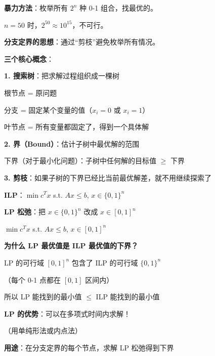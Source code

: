\documentclass[12pt, a4paper]{ctexart}
\begin{document}
\begin{blackboard}[分支定界的核心思想]

\textbf{暴力方法}：枚举所有 $2^n$ 种 0-1 组合，找最优的。

$n = 50$ 时，$2^{50} \approx 10^{15}$，不可行。

\textbf{分支定界的思想}：通过``剪枝''避免枚举所有情况。

\textbf{三个核心概念}：

\textbf{1. 搜索树}：把求解过程组织成一棵树

根节点 = 原问题

分支 = 固定某个变量的值（$x_i = 0$ 或 $x_i = 1$）

叶节点 = 所有变量都固定了，得到一个具体解

\textbf{2. 界（Bound）}：估计子树中最优解的范围

下界（对于最小化问题）：子树中任何解的目标值 $\geq$ 下界

\textbf{3. 剪枝}：如果子树的下界已经比当前最优解差，就不用继续探索了

\end{blackboard}

\begin{blackboard}[LP 松弛：计算下界的方法]

\textbf{ILP}：$\min c^T x$ \quad s.t. \quad $Ax \leq b$, \quad $x \in \{0, 1\}^n$

\textbf{LP 松弛}：把 $x \in \{0, 1\}^n$ 改成 $x \in [0, 1]^n$

$\min c^T x$ \quad s.t. \quad $Ax \leq b$, \quad $x \in [0, 1]^n$

\textbf{为什么 LP 最优值是 ILP 最优值的下界？}

LP 的可行域 $[0,1]^n$ 包含了 ILP 的可行域 $\{0,1\}^n$

（每个 0-1 点都在 $[0,1]$ 区间内）

所以 LP 能找到的最小值 $\leq$ ILP 能找到的最小值

\textbf{LP 的优势}：可以在多项式时间内求解！

（用单纯形法或内点法）

\textbf{用途}：在分支定界的每个节点，求解 LP 松弛得到下界

\end{blackboard}
\end{document}
